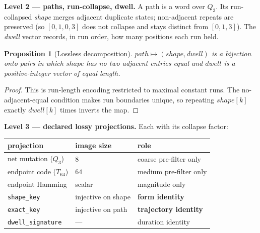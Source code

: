 \documentclass[11pt,a4paper]{article}
\newtheorem{proposition}{Proposition}
\begin{document}
\textbf{Level 2 --- paths, run-collapse, dwell.} A path is a word over $Q_3$. Its
run-collapsed \emph{shape} merges adjacent duplicate states; non-adjacent repeats
are preserved (so $[0,1,0,3]$ does not collapse and stays distinct from $[0,1,3]$).
The \emph{dwell} vector records, in run order, how many positions each run held.
\begin{proposition}[Lossless decomposition]
$\mathit{path}\mapsto(\mathit{shape},\mathit{dwell})$ is a bijection onto pairs in
which $\mathit{shape}$ has no two adjacent entries equal and $\mathit{dwell}$ is a
positive-integer vector of equal length.
\end{proposition}
\begin{proof}
This is run-length encoding restricted to maximal constant runs. The
no-adjacent-equal condition makes run boundaries unique, so repeating
$\mathit{shape}[k]$ exactly $\mathit{dwell}[k]$ times inverts the map. \end{proof}

\textbf{Level 3 --- declared lossy projections.} Each with its collapse factor:
\begin{center}
\begin{tabular}{lll}
\toprule
projection & image size & role \\
\midrule
net mutation ($Q_3$) & $8$ & coarse pre-filter only \\
endpoint code ($T_{64}$) & $64$ & medium pre-filter only \\
endpoint Hamming & scalar & magnitude only \\
\texttt{shape\_key} & injective on shape & \textbf{form identity} \\
\texttt{exact\_key} & injective on path & \textbf{trajectory identity} \\
\texttt{dwell\_signature} & --- & duration identity \\
\bottomrule
\end{tabular}
\end{center}
\end{document}
